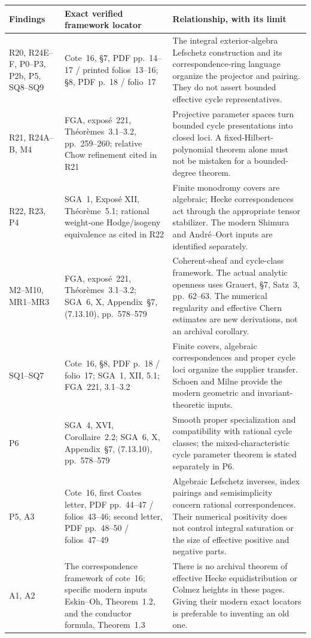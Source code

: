 \begingroup\small
\begin{longtable}{@{}>{\raggedright\arraybackslash}p{25mm}>{\raggedright\arraybackslash}p{44mm}>{\raggedright\arraybackslash}p{76mm}@{}}
\toprule
Findings & Exact verified framework locator & Relationship, with its limit\\
\midrule
\endhead
R20, R24E--F, P0--P3, P2b, P5, SQ8--SQ9 & Cote~16, \S7, PDF pp.~14--17 / printed folios~13--16; \S8, PDF p.~18 / folio~17 & The integral exterior-algebra Lefschetz construction and its correspondence-ring language organize the projector and pairing. They do not assert bounded effective cycle representatives.\\
R21, R24A--B, M4 & FGA, expos\'e~221, Th\'eor\`emes~3.1--3.2, pp.~259--260; relative Chow refinement cited in R21 & Projective parameter spaces turn bounded cycle presentations into closed loci. A fixed-Hilbert-polynomial theorem alone must not be mistaken for a bounded-degree theorem.\\
R22, R23, P4 & SGA~1, Expos\'e XII, Th\'eor\`eme~5.1; rational weight-one Hodge/isogeny equivalence as cited in R22 & Finite monodromy covers are algebraic; Hecke correspondences act through the appropriate tensor stabilizer. The modern Shimura and Andr\'e--Oort inputs are identified separately.\\
M2--M10, MR1--MR3 & FGA, expos\'e~221, Th\'eor\`emes~3.1--3.2; SGA~6, X, Appendix~\S7, (7.13.10), pp.~578--579 & Coherent-sheaf and cycle-class framework. The actual analytic openness uses Grauert, \S7, Satz~3, pp.~62--63. The numerical regularity and effective Chern estimates are new derivations, not an archival corollary.\\
SQ1--SQ7 & Cote~16, \S8, PDF p.~18 / folio~17; SGA~1, XII, 5.1; FGA~221, 3.1--3.2 & Finite covers, algebraic correspondences and proper cycle loci organize the supplier transfer. Schoen and Milne provide the modern geometric and invariant-theoretic inputs.\\
P6 & SGA~4, XVI, Corollaire~2.2; SGA~6, X, Appendix~\S7, (7.13.10), pp.~578--579 & Smooth proper specialization and compatibility with rational cycle classes; the mixed-characteristic cycle parameter theorem is stated separately in P6.\\
P5, A3 & Cote~16, first Coates letter, PDF pp.~44--47 / folios~43--46; second letter, PDF pp.~48--50 / folios~47--49 & Algebraic Lefschetz inverses, index pairings and semisimplicity concern rational correspondences. Their numerical positivity does not control integral saturation or the size of effective positive and negative parts.\\
A1, A2 & The correspondence framework of cote~16; specific modern inputs Eskin--Oh, Theorem~1.2, and the conductor formula, Theorem~1.3 & There is no archival theorem of effective Hecke equidistribution or Colmez heights in these pages. Giving their modern exact locators is preferable to inventing an old one.\\
\bottomrule
\end{longtable}
\endgroup

